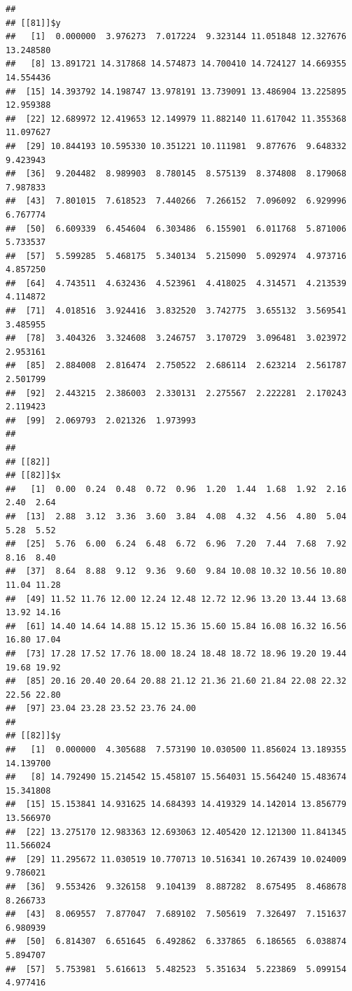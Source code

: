 \documentclass[
  ignorenonframetext,
]{beamer}
\begin{document}
\begin{frame}[fragile]{}
\begin{verbatim}
## 
## [[81]]$y
##   [1]  0.000000  3.976273  7.017224  9.323144 11.051848 12.327676 13.248580
##   [8] 13.891721 14.317868 14.574873 14.700410 14.724127 14.669355 14.554436
##  [15] 14.393792 14.198747 13.978191 13.739091 13.486904 13.225895 12.959388
##  [22] 12.689972 12.419653 12.149979 11.882140 11.617042 11.355368 11.097627
##  [29] 10.844193 10.595330 10.351221 10.111981  9.877676  9.648332  9.423943
##  [36]  9.204482  8.989903  8.780145  8.575139  8.374808  8.179068  7.987833
##  [43]  7.801015  7.618523  7.440266  7.266152  7.096092  6.929996  6.767774
##  [50]  6.609339  6.454604  6.303486  6.155901  6.011768  5.871006  5.733537
##  [57]  5.599285  5.468175  5.340134  5.215090  5.092974  4.973716  4.857250
##  [64]  4.743511  4.632436  4.523961  4.418025  4.314571  4.213539  4.114872
##  [71]  4.018516  3.924416  3.832520  3.742775  3.655132  3.569541  3.485955
##  [78]  3.404326  3.324608  3.246757  3.170729  3.096481  3.023972  2.953161
##  [85]  2.884008  2.816474  2.750522  2.686114  2.623214  2.561787  2.501799
##  [92]  2.443215  2.386003  2.330131  2.275567  2.222281  2.170243  2.119423
##  [99]  2.069793  2.021326  1.973993
## 
## 
## [[82]]
## [[82]]$x
##   [1]  0.00  0.24  0.48  0.72  0.96  1.20  1.44  1.68  1.92  2.16  2.40  2.64
##  [13]  2.88  3.12  3.36  3.60  3.84  4.08  4.32  4.56  4.80  5.04  5.28  5.52
##  [25]  5.76  6.00  6.24  6.48  6.72  6.96  7.20  7.44  7.68  7.92  8.16  8.40
##  [37]  8.64  8.88  9.12  9.36  9.60  9.84 10.08 10.32 10.56 10.80 11.04 11.28
##  [49] 11.52 11.76 12.00 12.24 12.48 12.72 12.96 13.20 13.44 13.68 13.92 14.16
##  [61] 14.40 14.64 14.88 15.12 15.36 15.60 15.84 16.08 16.32 16.56 16.80 17.04
##  [73] 17.28 17.52 17.76 18.00 18.24 18.48 18.72 18.96 19.20 19.44 19.68 19.92
##  [85] 20.16 20.40 20.64 20.88 21.12 21.36 21.60 21.84 22.08 22.32 22.56 22.80
##  [97] 23.04 23.28 23.52 23.76 24.00
## 
## [[82]]$y
##   [1]  0.000000  4.305688  7.573190 10.030500 11.856024 13.189355 14.139700
##   [8] 14.792490 15.214542 15.458107 15.564031 15.564240 15.483674 15.341808
##  [15] 15.153841 14.931625 14.684393 14.419329 14.142014 13.856779 13.566970
##  [22] 13.275170 12.983363 12.693063 12.405420 12.121300 11.841345 11.566024
##  [29] 11.295672 11.030519 10.770713 10.516341 10.267439 10.024009  9.786021
##  [36]  9.553426  9.326158  9.104139  8.887282  8.675495  8.468678  8.266733
##  [43]  8.069557  7.877047  7.689102  7.505619  7.326497  7.151637  6.980939
##  [50]  6.814307  6.651645  6.492862  6.337865  6.186565  6.038874  5.894707
##  [57]  5.753981  5.616613  5.482523  5.351634  5.223869  5.099154  4.977416

\end{verbatim}
\end{frame}
\end{document}
